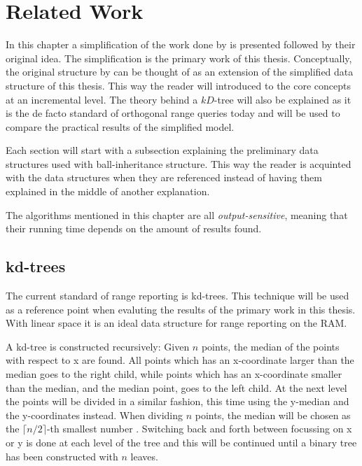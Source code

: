 \chapter{Related Work}
\label{ch:relatedwork}


In this chapter a simplification of the work done by \citet{chanetal} is presented followed by their original idea. The simplification is the primary work of this thesis. Conceptually, the original structure by \citet{chanetal} can be thought of as an extension of the simplified data structure of this thesis. This way the reader will introduced to the core concepts at an incremental level. The theory behind a $kD$-tree will also be explained as it is the de facto standard of orthogonal range queries today and will be used to compare the practical results of the simplified model. 

Each section will start with a subsection explaining the preliminary data structures used with ball-inheritance structure. This way the reader is acquinted with the data structures when they are referenced instead of having them explained in the middle of another explanation.

The algorithms mentioned in this chapter are all \emph{output-sensitive}, meaning that their running time depends on the amount of results found.

\section{kd-trees}

The current standard of range reporting is kd-trees. This technique will be used as a reference point when evaluting the results of the primary work in this thesis. With linear space it is an ideal data structure for range reporting on the RAM.

A kd-tree is constructed recursively: Given $n$ points, the median of the points with respect to x are found. All points which has an x-coordinate larger than the median goes to the right child, while points which has an x-coordinate smaller than the median, and the median point, goes to the left child. At the next level the points will be divided in a similar fashion, this time using the y-median and the y-coordinates instead. When dividing $n$ points, the median will be chosen as the $\lceil n/2 \rceil$-th smallest number \cite{compgeo}.
Switching back and forth between focussing on x or y is done at each level of the tree and this will be continued until a binary tree has been constructed with $n$ leaves.

